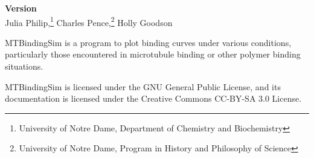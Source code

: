 \thispagestyle{empty}
\noindent{}

\begin{center}
	\Large \sffamily
	\vspace{0.5in} \par \textbf{Version \mtbversion} \\[1.5em]
	
	Julia Philip,\footnote{University of Notre Dame, Department of Chemistry and Biochemistry}
	Charles Pence,\footnote{University of Notre Dame, Program in History and Philosophy of Science}
	Holly Goodson\footnotemark[1]
	\vspace{1in}
\end{center} \par

MTBindingSim is a program to plot binding curves under various conditions, particularly those encountered in microtubule binding or other polymer binding situations.

MTBindingSim is licensed under the GNU General Public License, and its documentation is licensed under the Creative Commons CC-BY-SA 3.0 License.
